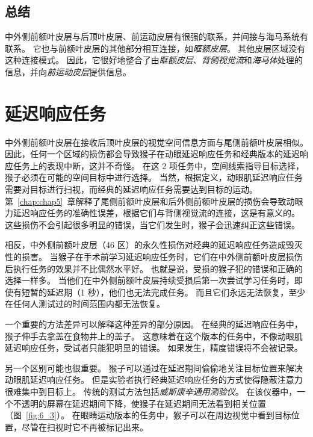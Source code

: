 \subsection{总结}

中外侧前额叶皮层与后顶叶皮层、前运动皮层有很强的联系，并间接与海马系统有联系。
它也与前额叶皮层的其他部分相互连接，如\textit{眶额皮层}。
其他皮层区域没有这种连接模式。
因此，它很好地整合了由\textit{眶额皮层}、\textit{背侧视觉流}和\textit{海马体}处理的信息，并向\textit{前运动皮层}提供信息。



\section{延迟响应任务}

中外侧前额叶皮层在接收后顶叶皮层的视觉空间信息方面与尾侧前额叶皮层相似。
因此，任何一个区域的损伤都会导致猴子在动眼延迟响应任务和经典版本的延迟响应任务上的表现中断，这并不奇怪。
在这 2 项任务中，空间线索指导目标选择，猴子必须在可能的空间目标中进行选择。
当然，根据定义，动眼肌延迟响应任务需要对目标进行扫视，而经典的延迟响应任务需要达到目标的运动。
第~\ref{chap:chap5}~章解释了尾侧前额叶皮层和后外侧前额叶皮层的损伤会导致动眼力延迟响应任务的准确性误差，根据它们与背侧视觉流的连接，这是有意义的。
这些损伤不会引起很多明显的错误，当它们发生时，猴子会迅速纠正这些错误\cite{tsujimoto2012prefrontal}。


相反，中外侧前额叶皮层（46 区）的永久性损伤对经典的延迟响应任务造成毁灭性的损害。
当猴子在手术前学习延迟响应任务时，它们在中外侧前额叶皮层损伤后执行任务的效果并不比偶然水平好\cite{goldman1978prenatal}。
也就是说，受损的猴子犯的错误和正确的选择一样多。
当他们在中外侧前额叶皮层持续受损后第一次尝试学习任务时，即使有短暂的延迟期（1 秒），他们也无法完成任务\cite{battig1960comparison}。
而且它们永远无法恢复，至少在任何人测试过的时间范围内都无法恢复。


一个重要的方法差异可以解释这种差异的部分原因。
在经典的延迟响应任务中，猴子伸手去拿盖在食物井上的盖子。
这意味着在这个版本的任务中，不像动眼肌延迟响应任务，受试者只能犯明显的错误。
如果发生，精度错误将不会被记录。


另一个区别可能也很重要。
猴子可以通过在延迟期间偷偷地关注目标位置来解决动眼肌延迟响应任务。
但是实验者执行经典延迟响应任务的方式使得隐蔽注意力很难集中到目标上。
传统的测试方法包括\textit{威斯康辛通用测验仪}。
在该仪器中，一个不透明的屏幕在延迟期间下降，使猴子在延迟期间无法看到相关位置（图~\ref{fig:6_3}）。
在眼睛运动版本的任务中，猴子可以在周边视觉中看到目标位置，尽管在扫视时它不再被标记出来。


